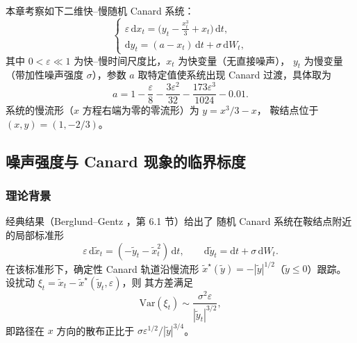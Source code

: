本章考察如下二维快--慢随机 Canard 系统：
\begin{equation}\label{eq:canard-SDE-ch4}
	\begin{cases}
		\varepsilon\,\mathrm{d}x_t
		= \bigl(y_t - \tfrac{x_t^3}{3} + x_t\bigr)\,\mathrm{d}t,\\[4pt]
		\mathrm{d}y_t
		= (a - x_t)\,\mathrm{d}t + \sigma\,\mathrm{d}W_t,
	\end{cases}
\end{equation}
其中 $0<\varepsilon\ll1$ 为快--慢时间尺度比，$x_t$ 为快变量（无直接噪声），
$y_t$ 为慢变量（带加性噪声强度 $\sigma$），参数 $a$ 取特定值使系统出现
Canard 过渡，具体取为
\begin{equation}\label{eq:a-def}
	a = 1 - \frac{\varepsilon}{8} - \frac{3\varepsilon^2}{32}
	- \frac{173\varepsilon^3}{1024} - 0.01.
\end{equation}
系统的慢流形（$x$ 方程右端为零的零流形）为 $y = x^3/3 - x$，
鞍结点位于 $(x,y)=(1,-2/3)$。

\subsection{噪声强度与 Canard 现象的临界标度}
\label{subsec:noise-sigma-c}

\subsubsection{理论背景}

经典结果（Berglund--Gentz \cite{berglund2006noise}，第 6.1 节）给出了
随机 Canard 系统在鞍结点附近的局部标准形
\begin{equation}\label{eq:normal-form}
	\varepsilon\,\mathrm{d}\tilde x_t
	= (-\tilde y_t - \tilde x_t^2)\,\mathrm{d}t,\qquad
	\mathrm{d}\tilde y_t = \mathrm{d}t + \sigma\,\mathrm{d}W_t.
\end{equation}
在该标准形下，确定性 Canard 轨道沿慢流形 $\tilde x^\star(\tilde y)
= -|\tilde y|^{1/2}$（$\tilde y\leq 0$）跟踪。
设扰动 $\xi_t = \tilde x_t - \tilde x^\star(\tilde y_t,\varepsilon)$，则
其方差满足
\begin{equation}\label{eq:xi-variance}
	\mathrm{Var}(\xi_t) \sim
	\frac{\sigma^2\varepsilon}{|\tilde y_t|^{3/2}},
\end{equation}
即路径在 $x$ 方向的散布正比于 $\sigma\varepsilon^{1/2}/|\tilde y|^{3/4}$。

